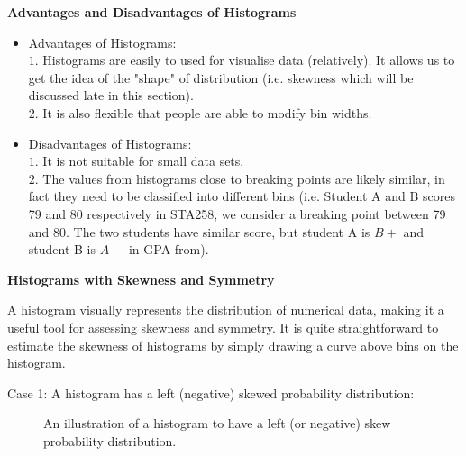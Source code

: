 \textbf{Advantages and Disadvantages of Histograms}

\begin{itemize}
 \item Advantages of Histograms:\\
 $1.$ Histograms are easily to used for visualise data (relatively). It allows us to get the idea of the "shape" of distribution (i.e. skewness which will be discussed late in this section).\\
 $2.$ It is also flexible that people are able to modify bin widths.
 \item Disadvantages of Histograms:\\
 $1.$ It is not suitable for small data sets.\\
 $2.$ The values from histograms close to breaking points are likely similar, in fact they need to be classified into different bins (i.e. Student A and B scores 79 and 80 respectively in   STA258, we consider a breaking point between 79 and 80. The two students have similar score, but student A is $B+$ and student B is $A-$ in GPA from).
 \end{itemize}
 
\textbf{Histograms with Skewness and Symmetry}

A histogram visually represents the distribution of numerical data, making it a useful tool for assessing skewness and symmetry. It is quite straightforward to estimate the skewness of histograms by simply drawing a curve above bins on the histogram.


Case 1: A histogram has a left (negative) skewed probability distribution:
\begin{figure}[H]
\begin{center}
\end{center}
\caption{An illustration of a histogram to have a left (or negative) skew probability distribution.}
\end{figure}

